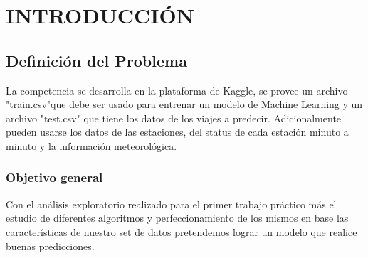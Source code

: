 \section{INTRODUCCIÓN}

\subsection{Definición del Problema}

La competencia se desarrolla en la plataforma de Kaggle, se provee un archivo "train.csv"que debe ser usado para entrenar un modelo de Machine Learning y un archivo "test.csv" que tiene los datos de los viajes a predecir. Adicionalmente pueden usarse los datos de las estaciones, del status de cada estación minuto a minuto y la información meteorológica.

\subsubsection{Objetivo general}
Con el análisis exploratorio realizado para el primer trabajo práctico más el estudio de diferentes algoritmos y perfeccionamiento de los mismos en base las características de nuestro set de datos pretendemos lograr un modelo que realice buenas predicciones.
